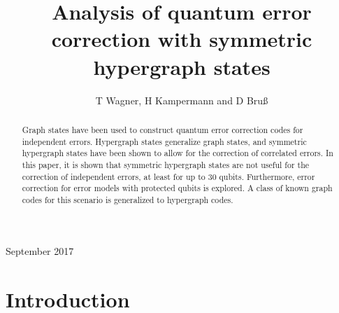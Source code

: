 \documentclass[12pt]{iopart}
\begin{document}
\title[Error correction with symmetric hypergraph states]{Analysis of quantum error correction with symmetric hypergraph states}

\author{T Wagner, H Kampermann and D Bruß}

\address{Institute for Theoretical Physics 3, Heinrich-Heine University Duesseldorf, Duesseldorf, Germany}
\vspace{10pt}
\begin{indented}
\item[]September 2017
\end{indented}

\begin{abstract}
Graph states have been used to construct quantum error correction codes for independent errors. Hypergraph states generalize graph states, and symmetric hypergraph states have been shown to allow for the correction of correlated errors. In this paper, it is shown that symmetric hypergraph states are not useful for the correction of independent errors, at least for up to 30 qubits. Furthermore, error correction for error models with protected qubits is explored. A class of known graph codes for this scenario is generalized to hypergraph codes.
\end{abstract}

%
%
%
\maketitle
% 
%



\section{Introduction}
\end{document}
